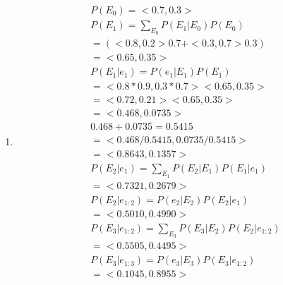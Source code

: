 \documentclass[letterpaper, 12pt]{article}
\begin{document}
\begin{enumerate}
\begin{enumerate}
            \item
                  \begin{gather*}
                      P(E_0) = <0.7, 0.3> \\
                      P(E_1) = \sum\limits_{E_0}P(E_1|E_0)P(E_0) \\
                      = (<0.8,0.2>0.7 + <0.3,0.7>0.3) \\
                      = <0.65, 0.35> \\
                      P(E_1|e_1)=P(e_1|E_1)P(E_1) \\
                      = <0.8*0.9,0.3*0.7><0.65,0.35> \\
                      = <0.72, 0.21><0.65,0.35> \\
                      = <0.468, 0.0735> \\
                      0.468+0.0735 = 0.5415 \\
                      =<0.468/0.5415, 0.0735/0.5415> \\
                      =<0.8643, 0.1357> \\
                      P(E_2|e_1) = \sum\limits_{E_1}P(E_2|E_1)P(E_1|e_1) \\
                      =<0.7321, 0.2679> \\
                      P(E_2|e_{1:2})=P(e_2|E_2)P(E_2|e_1) \\
                      = <0.5010, 0.4990> \\
                      P(E_3|e_{1:2})=\sum\limits_{E_3}P(E_3|E_2)P(E_2|e_{1:2}) \\
                      = <0.5505,0.4495> \\
                      P(E_3|e_{1:3})=P(e_3|E_3)P(E_3|e_{1:2}) \\
                      = <0.1045, 0.8955>
                  \end{gather*}
        \end{enumerate}
\end{enumerate}
\end{document}
